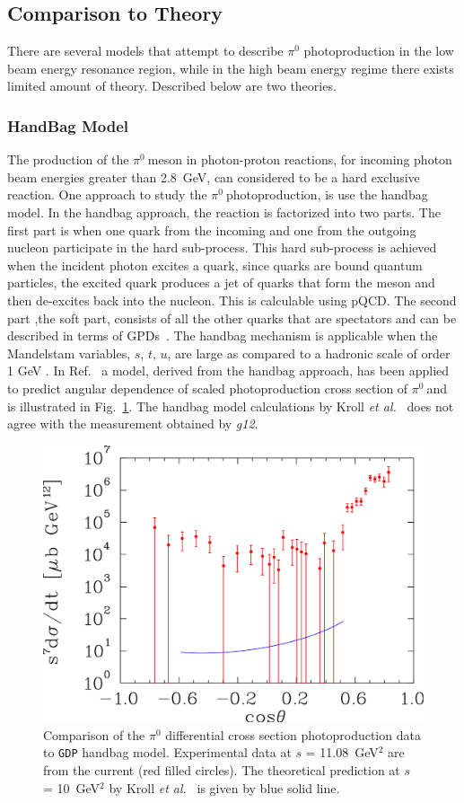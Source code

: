 \documentclass{aip-cp}
\def\g12{\emph{g12}}
\newcommand{\abbr}[1]{\textsc{\texttt{#1}}}
\def\piz{$\pi^{0}\ $}
\begin{document}
\subsection{Comparison to Theory}
There are several models that attempt to describe  $\pi^0$ photoproduction in the low beam energy resonance region, while in the high beam energy regime there exists limited amount of theory. Described below are two theories. 
\subsubsection{HandBag Model}
The production of the \piz meson in photon-proton reactions, for incoming photon beam energies greater than 2.8~GeV, can considered to be a hard exclusive reaction. One approach to study the \piz photoproduction, is use the handbag model. In the handbag approach, the reaction is factorized into two parts. The first part is when one quark from the incoming and one from the outgoing nucleon participate in the hard sub-process. This hard sub-process is achieved when the incident photon excites a quark, since quarks are bound quantum particles, the excited quark produces a jet of quarks that form the meson and then de-excites back into the nucleon. This is calculable using pQCD. The second part ,the soft part, consists of all the other quarks that are spectators and can be described in terms of GPDs~\cite{key1, key2,Rad1996, Diehl}. The handbag mechanism is applicable when the Mandelstam variables, $s$, $t$, $u$, are large as compared to a hadronic scale of order 1 GeV . In Ref.~\cite{Huang2000} a model, derived from the handbag approach, has been applied to predict angular dependence of scaled photoproduction cross section of \piz and is illustrated in Fig.~\ref{fig:pi0_handbag}. The handbag model calculations by Kroll \textit{et al.}~\cite{Huang2000} does not agree with the measurement obtained by \g12.
\begin{figure}[h]
	\centerline{\includegraphics[width=200 pt]{figures/kroll-eps-converted-to.pdf}}
	\caption{Comparison of the $\pi^0$ differential cross section  photoproduction data to \abbr{GDP} handbag model. Experimental data at $s$ = 11.08~GeV$^2$ are from the current (red filled circles). The theoretical prediction at $s$ = 10~GeV$^2$ by Kroll \textit{et al.}~\protect\cite{Huang2000} is given by blue solid line.}
	\label{fig:pi0_handbag}
\end{figure}
\end{document}
